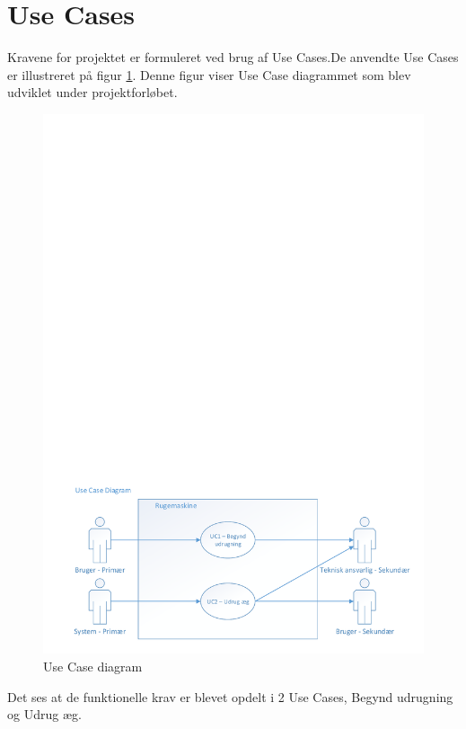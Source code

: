 \section{Use Cases}
Kravene for projektet er formuleret ved brug af Use Cases.\newline De anvendte Use Cases er illustreret på figur \ref{fig:usecase_diagram}. Denne figur viser Use Case diagrammet som blev udviklet under projektforløbet.
\begin{figure}[h]
\centering
\includegraphics[width=16cm, scale=0.8, trim= 0mm 0mm 0mm 200mm, clip=true,  angle=0]{6_krav/diagrammer/UseCase_Generel_v1.pdf}
\caption{Use Case diagram}
\label{fig:usecase_diagram}
\end{figure}
\newline Det ses at de funktionelle krav er blevet opdelt i 2 Use Cases, Begynd udrugning og Udrug æg.


